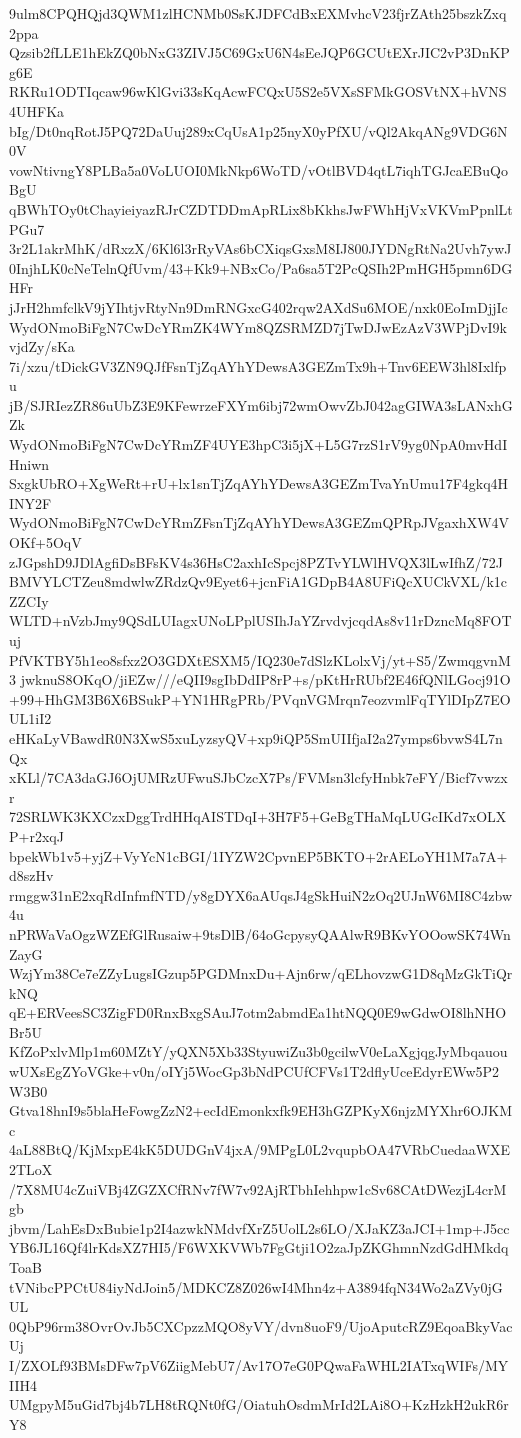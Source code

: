 9ulm8CPQHQjd3QWM1zlHCNMb0SsKJDFCdBxEXMvhcV23fjrZAth25bszkZxq2ppa
Qzsib2fLLE1hEkZQ0bNxG3ZIVJ5C69GxU6N4sEeJQP6GCUtEXrJIC2vP3DnKPg6E
RKRu1ODTIqcaw96wKlGvi33sKqAcwFCQxU5S2e5VXsSFMkGOSVtNX+hVNS4UHFKa
bIg/Dt0nqRotJ5PQ72DaUuj289xCqUsA1p25nyX0yPfXU/vQl2AkqANg9VDG6N0V
vowNtivngY8PLBa5a0VoLUOI0MkNkp6WoTD/vOtlBVD4qtL7iqhTGJcaEBuQoBgU
qBWhTOy0tChayieiyazRJrCZDTDDmApRLix8bKkhsJwFWhHjVxVKVmPpnlLtPGu7
3r2L1akrMhK/dRxzX/6Kl6l3rRyVAs6bCXiqsGxsM8IJ800JYDNgRtNa2Uvh7ywJ
0InjhLK0cNeTelnQfUvm/43+Kk9+NBxCo/Pa6sa5T2PcQSIh2PmHGH5pmn6DGHFr
jJrH2hmfclkV9jYIhtjvRtyNn9DmRNGxcG402rqw2AXdSu6MOE/nxk0EoImDjjIc
WydONmoBiFgN7CwDcYRmZK4WYm8QZSRMZD7jTwDJwEzAzV3WPjDvI9kvjdZy/sKa
7i/xzu/tDickGV3ZN9QJfFsnTjZqAYhYDewsA3GEZmTx9h+Tnv6EEW3hl8Ixlfpu
jB/SJRIezZR86uUbZ3E9KFewrzeFXYm6ibj72wmOwvZbJ042agGIWA3sLANxhGZk
WydONmoBiFgN7CwDcYRmZF4UYE3hpC3i5jX+L5G7rzS1rV9yg0NpA0mvHdIHniwn
SxgkUbRO+XgWeRt+rU+lx1snTjZqAYhYDewsA3GEZmTvaYnUmu17F4gkq4HINY2F
WydONmoBiFgN7CwDcYRmZFsnTjZqAYhYDewsA3GEZmQPRpJVgaxhXW4VOKf+5OqV
zJGpshD9JDlAgfiDsBFsKV4s36HsC2axhIcSpcj8PZTvYLWlHVQX3lLwIfhZ/72J
BMVYLCTZeu8mdwlwZRdzQv9Eyet6+jcnFiA1GDpB4A8UFiQcXUCkVXL/k1cZZCIy
WLTD+nVzbJmy9QSdLUIagxUNoLPplUSIhJaYZrvdvjcqdAs8v11rDzncMq8FOTuj
PfVKTBY5h1eo8sfxz2O3GDXtESXM5/IQ230e7dSlzKLolxVj/yt+S5/ZwmqgvnM3
jwknuS8OKqO/jiEZw///eQII9sgIbDdIP8rP+s/pKtHrRUbf2E46fQNlLGocj91O
+99+HhGM3B6X6BSukP+YN1HRgPRb/PVqnVGMrqn7eozvmlFqTYlDIpZ7EOUL1iI2
eHKaLyVBawdR0N3XwS5xuLyzsyQV+xp9iQP5SmUIIfjaI2a27ymps6bvwS4L7nQx
xKLl/7CA3daGJ6OjUMRzUFwuSJbCzcX7Ps/FVMsn3lcfyHnbk7eFY/Bicf7vwzxr
72SRLWK3KXCzxDggTrdHHqAISTDqI+3H7F5+GeBgTHaMqLUGcIKd7xOLXP+r2xqJ
bpekWb1v5+yjZ+VyYcN1cBGI/1IYZW2CpvnEP5BKTO+2rAELoYH1M7a7A+d8szHv
rmggw31nE2xqRdInfmfNTD/y8gDYX6aAUqsJ4gSkHuiN2zOq2UJnW6MI8C4zbw4u
nPRWaVaOgzWZEfGlRusaiw+9tsDlB/64oGcpysyQAAlwR9BKvYOOowSK74WnZayG
WzjYm38Ce7eZZyLugsIGzup5PGDMnxDu+Ajn6rw/qELhovzwG1D8qMzGkTiQrkNQ
qE+ERVeesSC3ZigFD0RnxBxgSAuJ7otm2abmdEa1htNQQ0E9wGdwOI8lhNHOBr5U
KfZoPxlvMlp1m60MZtY/yQXN5Xb33StyuwiZu3b0gcilwV0eLaXgjqgJyMbqauou
wUXsEgZYoVGke+v0n/oIYj5WocGp3bNdPCUfCFVs1T2dflyUceEdyrEWw5P2W3B0
Gtva18hnI9s5blaHeFowgZzN2+ecIdEmonkxfk9EH3hGZPKyX6njzMYXhr6OJKMc
4aL88BtQ/KjMxpE4kK5DUDGnV4jxA/9MPgL0L2vqupbOA47VRbCuedaaWXE2TLoX
/7X8MU4cZuiVBj4ZGZXCfRNv7fW7v92AjRTbhIehhpw1cSv68CAtDWezjL4crMgb
jbvm/LahEsDxBubie1p2I4azwkNMdvfXrZ5UolL2s6LO/XJaKZ3aJCI+1mp+J5cc
YB6JL16Qf4lrKdsXZ7HI5/F6WXKVWb7FgGtji1O2zaJpZKGhmnNzdGdHMkdqToaB
tVNibcPPCtU84iyNdJoin5/MDKCZ8Z026wI4Mhn4z+A3894fqN34Wo2aZVy0jGUL
0QbP96rm38OvrOvJb5CXCpzzMQO8yVY/dvn8uoF9/UjoAputcRZ9EqoaBkyVacUj
I/ZXOLf93BMsDFw7pV6ZiigMebU7/Av17O7eG0PQwaFaWHL2IATxqWIFs/MYIIH4
UMgpyM5uGid7bj4b7LH8tRQNt0fG/OiatuhOsdmMrId2LAi8O+KzHzkH2ukR6rY8
